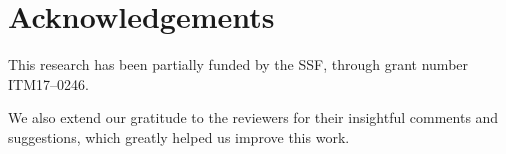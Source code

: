 \section*{Acknowledgements}\label{sec:acks}

This research has been partially funded by the \gls{SSF}, through grant number ITM17--0246.

We also extend our gratitude to the reviewers for their insightful comments and suggestions, which greatly helped us improve this work.
